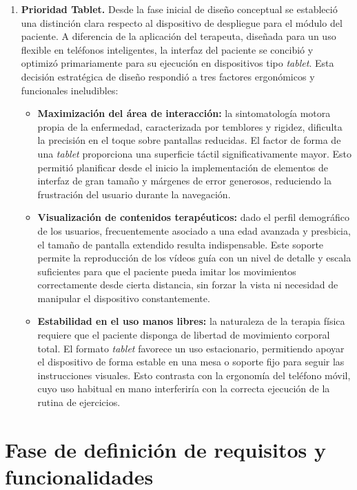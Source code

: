 \begin{enumerate}
    \item \textbf{Prioridad Tablet.} Desde la fase inicial de diseño conceptual se estableció una distinción clara respecto al dispositivo de despliegue para el módulo del paciente. A diferencia de la aplicación del terapeuta, diseñada para un uso flexible en teléfonos inteligentes, la interfaz del paciente se concibió y optimizó primariamente para su ejecución en dispositivos tipo \textit{tablet}. Esta decisión estratégica de diseño respondió a tres factores ergonómicos y funcionales ineludibles:
    \begin{itemize}
        \item \textbf{Maximización del área de interacción:} la sintomatología motora propia de la enfermedad, caracterizada por temblores y rigidez, dificulta la precisión en el toque sobre pantallas reducidas. El factor de forma de una \textit{tablet} proporciona una superficie táctil significativamente mayor. Esto permitió planificar desde el inicio la implementación de elementos de interfaz de gran tamaño y márgenes de error generosos, reduciendo la frustración del usuario durante la navegación.
        \item \textbf{Visualización de contenidos terapéuticos:} dado el perfil demográfico de los usuarios, frecuentemente asociado a una edad avanzada y presbicia, el tamaño de pantalla extendido resulta indispensable. Este soporte permite la reproducción de los vídeos guía con un nivel de detalle y escala suficientes para que el paciente pueda imitar los movimientos correctamente desde cierta distancia, sin forzar la vista ni necesidad de manipular el dispositivo constantemente.
        \item \textbf{Estabilidad en el uso manos libres:} la naturaleza de la terapia física requiere que el paciente disponga de libertad de movimiento corporal total. El formato \textit{tablet} favorece un uso estacionario, permitiendo apoyar el dispositivo de forma estable en una mesa o soporte fijo para seguir las instrucciones visuales. Esto contrasta con la ergonomía del teléfono móvil, cuyo uso habitual en mano interferiría con la correcta ejecución de la rutina de ejercicios.
    \end{itemize}
\end{enumerate}

\section{Fase de definición de requisitos y funcionalidades}

